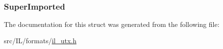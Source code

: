 \hypertarget{struct_u_t_x_e_x_p_o_r_t_t_a_b_l_e_ac76c32d909fe1667ebfd61703b28b8bf}{
\subsubsection[{Super\-Imported}]{ Super\-Imported}}\label{struct_u_t_x_e_x_p_o_r_t_t_a_b_l_e_ac76c32d909fe1667ebfd61703b28b8bf}


The documentation for this struct was generated from the following file\-:\begin{DoxyCompactItemize}
\item 
src/\-I\-L/formats/\hyperlink{il__utx_8h}{il\-\_\-utx.\-h}\end{DoxyCompactItemize}
